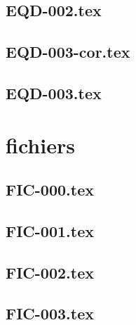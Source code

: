 \renewcommand{\xxexo}{EQD-002.tex} 
\subsection*{\xxexo} 
\graphicspath{{../../exosequadiffs/equadiffs/\xxexo/}}
 
 
\renewcommand{\xxexo}{EQD-003-cor.tex} 
\subsection*{\xxexo} 
\graphicspath{{../../exosequadiffs/equadiffs/\xxexo/}}
 
 
\renewcommand{\xxexo}{EQD-003.tex} 
\subsection*{\xxexo} 
\graphicspath{{../../exosequadiffs/equadiffs/\xxexo/}}
 
 
\section*{fichiers}
\renewcommand{\xxexo}{FIC-000.tex} 
\subsection*{\xxexo} 
\graphicspath{{../../exosfichiers/equadiffs/\xxexo/}}
 
 
\renewcommand{\xxexo}{FIC-001.tex} 
\subsection*{\xxexo} 
\graphicspath{{../../exosfichiers/equadiffs/\xxexo/}}
 
 
\renewcommand{\xxexo}{FIC-002.tex} 
\subsection*{\xxexo} 
\graphicspath{{../../exosfichiers/equadiffs/\xxexo/}}
 
 
\renewcommand{\xxexo}{FIC-003.tex} 
\subsection*{\xxexo} 
\graphicspath{{../../exosfichiers/equadiffs/\xxexo/}}
 
 
